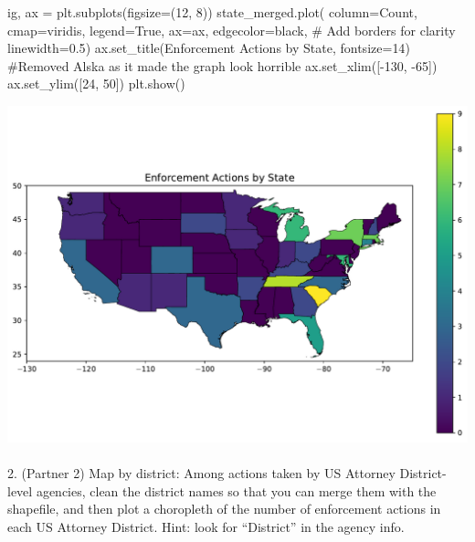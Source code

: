 \documentclass[
  letterpaper,
  DIV=11,
  numbers=noendperiod]{scrartcl}
\makeatletter
\let\oldparagraph\paragraph
\renewcommand{\paragraph}{
    \@ifstar
      \xxxParagraphStar
      \xxxParagraphNoStar
  }
\newcommand{\xxxParagraphStar}[1]{\oldparagraph*{#1}\mbox{}}
\newcommand{\xxxParagraphNoStar}[1]{\oldparagraph{#1}\mbox{}}
\newenvironment{Shaded}{\begin{snugshade}}{\end{snugshade}}
\newcommand{\CommentTok}[1]{\textcolor[rgb]{0.37,0.37,0.37}{#1}}
\newcommand{\DecValTok}[1]{\textcolor[rgb]{0.68,0.00,0.00}{#1}}
\newcommand{\FloatTok}[1]{\textcolor[rgb]{0.68,0.00,0.00}{#1}}
\newcommand{\NormalTok}[1]{\textcolor[rgb]{0.00,0.23,0.31}{#1}}
\newcommand{\OperatorTok}[1]{\textcolor[rgb]{0.37,0.37,0.37}{#1}}
\newcommand{\StringTok}[1]{\textcolor[rgb]{0.13,0.47,0.30}{#1}}
\newcommand{\VariableTok}[1]{\textcolor[rgb]{0.07,0.07,0.07}{#1}}
\makeatother
\begin{document}
\begin{Shaded}
\begin{Highlighting}[]
\NormalTok{ig, ax }\OperatorTok{=}\NormalTok{ plt.subplots(figsize}\OperatorTok{=}\NormalTok{(}\DecValTok{12}\NormalTok{, }\DecValTok{8}\NormalTok{))  }
\NormalTok{state\_merged.plot(}
\NormalTok{    column}\OperatorTok{=}\StringTok{\textquotesingle{}Count\textquotesingle{}}\NormalTok{, }
\NormalTok{    cmap}\OperatorTok{=}\StringTok{\textquotesingle{}viridis\textquotesingle{}}\NormalTok{, }
\NormalTok{    legend}\OperatorTok{=}\VariableTok{True}\NormalTok{, }
\NormalTok{    ax}\OperatorTok{=}\NormalTok{ax,}
\NormalTok{    edgecolor}\OperatorTok{=}\StringTok{\textquotesingle{}black\textquotesingle{}}\NormalTok{,  }\CommentTok{\# Add borders for clarity}
\NormalTok{    linewidth}\OperatorTok{=}\FloatTok{0.5}\NormalTok{)}
\NormalTok{ax.set\_title(}\StringTok{\textquotesingle{}Enforcement Actions by State\textquotesingle{}}\NormalTok{, fontsize}\OperatorTok{=}\DecValTok{14}\NormalTok{)}
\CommentTok{\#Removed Alska as it made the graph look horrible}
\NormalTok{ax.set\_xlim([}\OperatorTok{{-}}\DecValTok{130}\NormalTok{, }\OperatorTok{{-}}\DecValTok{65}\NormalTok{])}
\NormalTok{ax.set\_ylim([}\DecValTok{24}\NormalTok{, }\DecValTok{50}\NormalTok{])}
\NormalTok{plt.show()}
\end{Highlighting}
\end{Shaded}

\includegraphics{ps5_files/figure-pdf/cell-23-output-1.pdf}

\paragraph{2. (Partner 2) Map by district: Among actions taken by US
Attorney District-level agencies, clean the district names so that you
can merge them with the shapefile, and then plot a choropleth of the
number of enforcement actions in each US Attorney District. Hint: look
for ``District'' in the agency
info.}\label{partner-2-map-by-district-among-actions-taken-by-us-attorney-district-level-agencies-clean-the-district-names-so-that-you-can-merge-them-with-the-shapefile-and-then-plot-a-choropleth-of-the-number-of-enforcement-actions-in-each-us-attorney-district.-hint-look-for-district-in-the-agency-info.}
\end{document}
